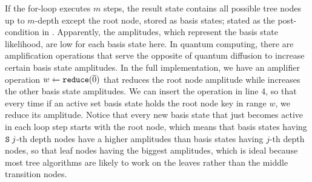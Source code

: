 If the for-loop executes $m$ steps, the result state contains all possible tree nodes up to $m$-depth except the root node, stored as basis states; stated as the post-condition in .
Apparently, the amplitudes, which represent the basis state likelihood, are low for each basis state here. In quantum computing, there are amplification operations that serve the opposite of quantum diffusion to increase certain basis state amplitudes. In the full \qafny implementation, we have an amplifier operation ${w} \xleftarrow{} {\texttt{reduce}(\overline{0})}$ that reduces the root node amplitude while increases the other basis state amplitudes. We can insert the operation in  line 4, so that every time if an active set basis state holds the root node key in range $w$, we reduce its amplitude. Notice that every new basis state that just becomes active in each loop step starts with the root node, which means that basis states having $\texttt{S}\;j$-th depth nodes have a higher amplitudes than basis states having $j$-th depth nodes, so that leaf nodes having the biggest amplitudes, which is ideal because most tree algorithms are likely to work on the leaves rather than the middle transition nodes. 













